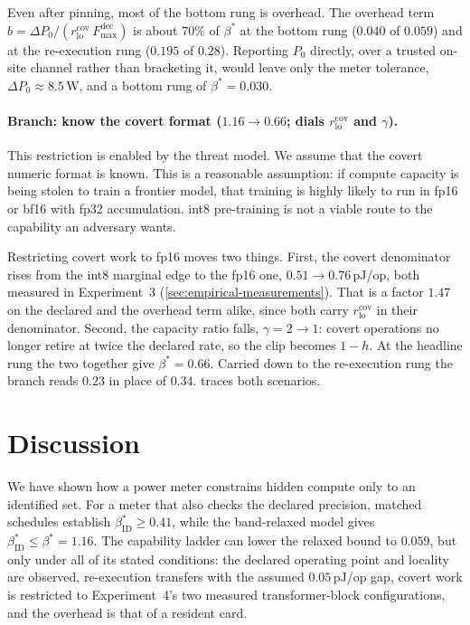 \documentclass{article}
\theoremstyle{plain}
\theoremstyle{definition}
\theoremstyle{remark}
\begin{document}
Even after pinning, most of the bottom rung is overhead. The overhead term
$b = \Delta P_0/(r_{\mathrm{lo}}^{\mathrm{cov}}\,F_{\max}^{\mathrm{dec}})$ is
about $70\%$ of $\beta^{*}$ at the bottom rung ($0.040$ of $0.059$) and at the
re-execution rung ($0.195$ of $0.28$). Reporting $P_0$ directly, over a trusted
on-site channel rather than bracketing it, would leave only the meter tolerance,
$\Delta P_0 \approx 8.5$\,W, and a bottom rung of $\beta^{*}=0.030$.

\paragraph{Branch: know the covert format ($1.16 \to 0.66$; dials $r_{\mathrm{lo}}^{\mathrm{cov}}$ and $\gamma$).}

This restriction is enabled by the threat model. We assume that the covert numeric format
is known. This is a reasonable assumption:  if compute capacity is being stolen to train a frontier model, that training is highly likely to run in fp16 or bf16 with fp32 accumulation. int8 pre-training is not a viable route to the capability
an adversary wants.

Restricting covert work to fp16 moves two things. First, the covert
denominator rises from the int8 marginal edge to the fp16 one,
$0.51 \to 0.76$\,pJ/op, both measured in Experiment~3
(\cref{sec:empirical-measurements}). That is a factor $1.47$ on the declared and
the overhead term alike, since both carry $r_{\mathrm{lo}}^{\mathrm{cov}}$ in
their denominator. Second, the capacity ratio falls, $\gamma = 2 \to 1$: covert
operations no longer retire at twice the declared rate, so the clip becomes
$1-h$. At the headline rung the two together give $\beta^{*} = 0.66$. Carried down to the re-execution rung the branch reads $0.23$ in
place of $0.34$.  traces both scenarios.


\section{Discussion}
\label{sec:discussion}
We have shown how a power meter constrains hidden compute only to an identified
set. For a meter that also checks the declared precision, matched schedules
establish $\beta_{\mathrm{ID}}^{*} \geq 0.41$, while the band-relaxed model
gives $\beta_{\mathrm{ID}}^{*} \leq \beta^{*} = 1.16$. The capability ladder
can lower the relaxed bound to $0.059$, but only under all of its stated
conditions: the declared operating point and locality are observed,
re-execution transfers with the assumed $0.05$\,pJ/op gap, covert work is
restricted to Experiment~4's two measured transformer-block configurations,
and the overhead is that of a resident card.
\end{document}

